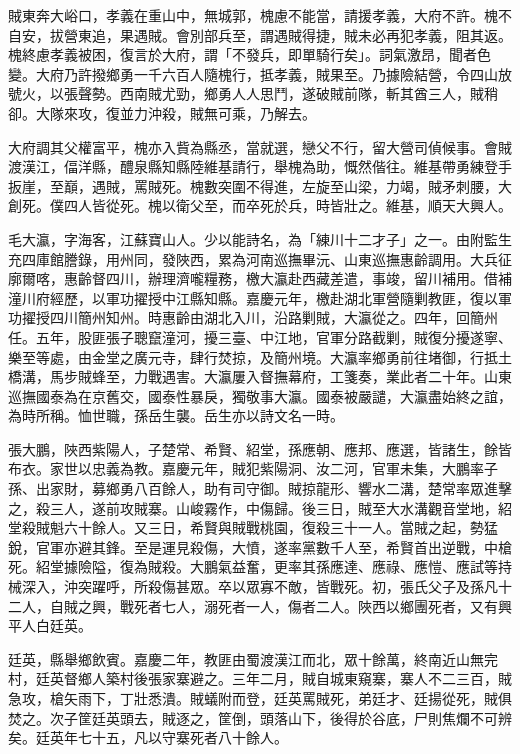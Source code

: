 \begin{pinyinscope}
賊東奔大峪口，孝義在重山中，無城郭，槐慮不能當，請援孝義，大府不許。槐不自安，拔營東追，果遇賊。會別部兵至，謂遇賊得捷，賊未必再犯孝義，阻其返。槐終慮孝義被困，復言於大府，謂「不發兵，即單騎行矣」。詞氣激昂，聞者色變。大府乃許撥鄉勇一千六百人隨槐行，抵孝義，賊果至。乃據險結營，令四山放號火，以張聲勢。西南賊尤勁，鄉勇人人思鬥，遂破賊前隊，斬其酋三人，賊稍卻。大隊來攻，復並力沖殺，賊無可乘，乃解去。

大府調其父權富平，槐亦入貲為縣丞，當就選，戀父不行，留大營司偵候事。會賊渡漢江，偪洋縣，醴泉縣知縣陸維基請行，舉槐為助，慨然偕往。維基帶勇練登手扳崖，至巔，遇賊，罵賊死。槐數突圍不得進，左旋至山梁，力竭，賊矛刺腰，大創死。僕四人皆從死。槐以衛父至，而卒死於兵，時皆壯之。維基，順天大興人。

毛大瀛，字海客，江蘇寶山人。少以能詩名，為「練川十二才子」之一。由附監生充四庫館謄錄，用州同，發陜西，累為河南巡撫畢沅、山東巡撫惠齡調用。大兵征廓爾喀，惠齡督四川，辦理濟嚨糧務，檄大瀛赴西藏差遣，事竣，留川補用。借補潼川府經歷，以軍功擢授中江縣知縣。嘉慶元年，檄赴湖北軍營隨剿教匪，復以軍功擢授四川簡州知州。時惠齡由湖北入川，沿路剿賊，大瀛從之。四年，回簡州任。五年，股匪張子聰竄潼河，擾三臺、中江地，官軍分路截剿，賊復分擾遂寧、樂至等處，由金堂之廣元寺，肆行焚掠，及簡州境。大瀛率鄉勇前往堵御，行抵土橋溝，馬步賊蜂至，力戰遇害。大瀛屢入督撫幕府，工箋奏，業此者二十年。山東巡撫國泰為在京舊交，國泰性暴戾，獨敬事大瀛。國泰被嚴譴，大瀛盡始終之誼，為時所稱。恤世職，孫岳生襲。岳生亦以詩文名一時。

張大鵬，陜西紫陽人，子楚常、希賢、紹堂，孫應朝、應邦、應選，皆諸生，餘皆布衣。家世以忠義為教。嘉慶元年，賊犯紫陽洞、汝二河，官軍未集，大鵬率子孫、出家財，募鄉勇八百餘人，助有司守御。賊掠龍形、響水二溝，楚常率眾進擊之，殺三人，遂前攻賊寨。山峻霧作，中傷歸。後三日，賊至大水溝觀音堂地，紹堂殺賊魁六十餘人。又三日，希賢與賊戰桃園，復殺三十一人。當賊之起，勢猛銳，官軍亦避其鋒。至是運見殺傷，大憤，遂率黨數千人至，希賢首出逆戰，中槍死。紹堂據險隘，復為賊殺。大鵬氣益奮，更率其孫應達、應祿、應愷、應試等持械深入，沖突躍呼，所殺傷甚眾。卒以眾寡不敵，皆戰死。初，張氏父子及孫凡十二人，自賊之興，戰死者七人，溺死者一人，傷者二人。陜西以鄉團死者，又有興平人白廷英。

廷英，縣舉鄉飲賓。嘉慶二年，教匪由蜀渡漢江而北，眾十餘萬，終南近山無完村，廷英督鄉人築村後張家寨避之。三年二月，賊自城東窺寨，寨人不二三百，賊急攻，槍矢雨下，丁壯悉潰。賊蟻附而登，廷英罵賊死，弟廷才、廷揚從死，賊俱焚之。次子筐廷英頭去，賊逐之，筐倒，頭落山下，後得於谷底，尸則焦爛不可辨矣。廷英年七十五，凡以守寨死者八十餘人。


\end{pinyinscope}
